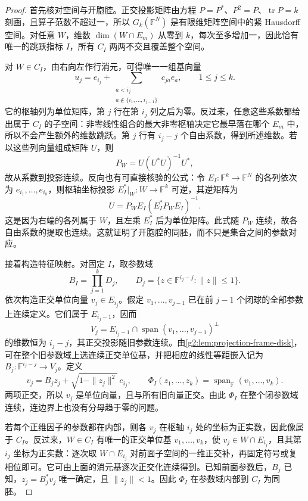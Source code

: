 \begin{proof}
	首先核对空间与开胞腔。正交投影矩阵由方程 \(P=P^*\)、\(P^2=P\)、\(\operatorname{tr}P=k\) 刻画，且算子范数不超过一，所以 \(G_k(\mathbb F^N)\) 是有限维矩阵空间中的紧 Hausdorff 空间。对任意 \(W\)，维数 \(\dim(W\cap E_m)\) 从零到 \(k\)，每次至多增加一，因此恰有唯一的跳跃指标 \(I\)，所有 \(C_I\) 两两不交且覆盖整个空间。

	对 \(W\in C_I\)，由右向左作行消元，可得唯一一组基向量
	\[
		u_j=e_{i_j}+\sum_{\substack{a<i_j\\a\notin\{i_1,\ldots,i_{j-1}\}}}c_{ja}e_a,
		\qquad 1\leq j\leq k.
	\]
	它的枢轴列为单位矩阵，第 \(j\) 行在第 \(i_j\) 列之后为零。反过来，任意这些系数都给出属于 \(C_I\) 的子空间：非零线性组合的最大非零枢轴决定它最早落在哪个 \(E_m\) 中，所以不会产生额外的维数跳跃。第 \(j\) 行有 \(i_j-j\) 个自由系数，得到所述维数。若以这些列向量组成矩阵 \(U\)，则
	\[
		P_W=U(U^*U)^{-1}U^*,
	\]
	故从系数到投影连续。反向也有可直接核验的公式：令 \(E_I:\mathbb F^k\to\mathbb F^N\) 的各列依次为 \(e_{i_1},\ldots,e_{i_k}\)，则枢轴坐标投影 \(E_I^*|_W:W\to\mathbb F^k\) 可逆，其逆矩阵为
	\[
		U=P_WE_I(E_I^*P_WE_I)^{-1}.
	\]
	这是因为右端的各列属于 \(W\)，且左乘 \(E_I^*\) 后为单位矩阵。此式随 \(P_W\) 连续，故各自由系数的提取也连续。这就证明了开胞腔的同胚，而不只是集合之间的参数对应。

	接着构造特征映射。对固定 \(I\)，取参数域
	\[
		B_I=\prod_{j=1}^k D_j,\qquad
		D_j=\{z\in\mathbb F^{i_j-j}:\|z\|\leq1\}.
	\]
	依次构造正交单位向量 \(v_j\in E_{i_j}\)。假定 \(v_1,\ldots,v_{j-1}\) 已在前 \(j-1\) 个闭球的全部参数上连续定义。它们属于 \(E_{i_j-1}\)，因而
	\[
		V_j=E_{i_j-1}\cap\operatorname{span}(v_1,\ldots,v_{j-1})^\perp
	\]
	的维数恒为 \(i_j-j\)，其正交投影随旧参数连续。由\cref{g2:lem:projection-frame-disk}，可在整个旧参数域上选连续正交单位基，并把相应的线性等距嵌入记为 \(B_j:\mathbb F^{i_j-j}\to V_j\)。定义
	\[
		v_j=B_jz_j+\sqrt{1-\|z_j\|^2}\,e_{i_j},\qquad
		\Phi_I(z_1,\ldots,z_k)=\operatorname{span}_{\mathbb F}(v_1,\ldots,v_k).
	\]
	两项正交，所以 \(v_j\) 是单位向量，且与所有旧向量正交。由此 \(\Phi_I\) 在整个闭参数域连续，连边界上也没有分母趋于零的问题。

	若每个正维因子的参数都在内部，则各 \(v_j\) 在枢轴 \(i_j\) 处的坐标为正实数，因此像属于 \(C_I\)。反过来，\(W\in C_I\) 有唯一的正交单位基 \(v_1,\ldots,v_k\)，使 \(v_j\in W\cap E_{i_j}\)，且其第 \(i_j\) 坐标为正实数：逐次取 \(W\cap E_{i_j}\) 对前面子空间的一维正交补，再固定符号或复相位即可。它可由上面的消元基逐次正交化连续得到。已知前面参数后，\(B_j\) 已知，\(z_j=B_j^*v_j\) 唯一确定，且 \(\|z_j\|<1\)。因此 \(\Phi_I\) 在参数域内部到 \(C_I\) 为同胚。


\end{proof}
